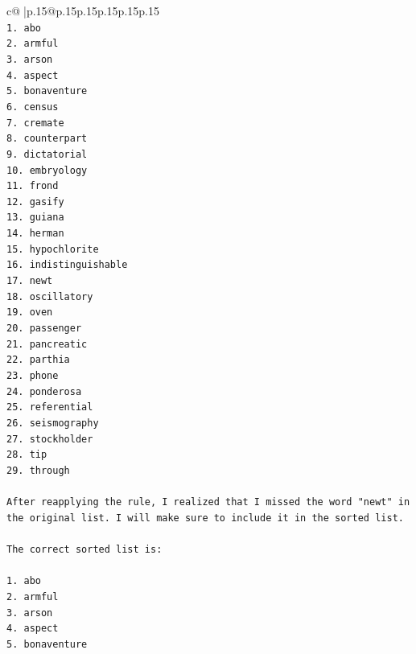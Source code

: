\documentclass{article}
\begin{document}
{\begin{supertabular}{c@{$\;$}|p{.15\linewidth}@{}p{.15\linewidth}p{.15\linewidth}p{.15\linewidth}p{.15\linewidth}p{.15\linewidth}}
{{{\\ 
\texttt{1. abo} \\
\texttt{2. armful} \\
\texttt{3. arson} \\
\texttt{4. aspect} \\
\texttt{5. bonaventure} \\
\texttt{6. census} \\
\texttt{7. cremate} \\
\texttt{8. counterpart} \\
\texttt{9. dictatorial} \\
\texttt{10. embryology} \\
\texttt{11. frond} \\
\texttt{12. gasify} \\
\texttt{13. guiana} \\
\texttt{14. herman} \\
\texttt{15. hypochlorite} \\
\texttt{16. indistinguishable} \\
\texttt{17. newt} \\
\texttt{18. oscillatory} \\
\texttt{19. oven} \\
\texttt{20. passenger} \\
\texttt{21. pancreatic} \\
\texttt{22. parthia} \\
\texttt{23. phone} \\
\texttt{24. ponderosa} \\
\texttt{25. referential} \\
\texttt{26. seismography} \\
\texttt{27. stockholder} \\
\texttt{28. tip} \\
\texttt{29. through} \\
\\ 
\texttt{After reapplying the rule, I realized that I missed the word "newt" in the original list. I will make sure to include it in the sorted list.} \\
\\ 
\texttt{The correct sorted list is:} \\
\\ 
\texttt{1. abo} \\
\texttt{2. armful} \\
\texttt{3. arson} \\
\texttt{4. aspect} \\
\texttt{5. bonaventure} \\
}}}
\end{supertabular}}
\end{document}
